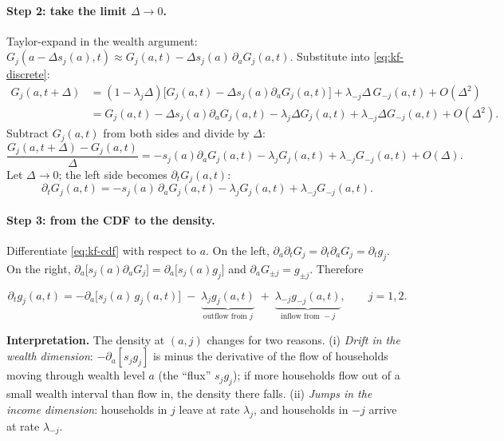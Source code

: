 \paragraph{Step 2: take the limit $\Delta\to0$.}
Taylor-expand in the wealth argument: $G_j(a-\Delta s_j(a),t)\approx G_j(a,t)-\Delta s_j(a)\,\partial_aG_j(a,t)$. Substitute into \eqref{eq:kf-discrete}:
\begin{align*}
  G_j(a,t+\Delta) &= (1-\lambda_j\Delta)\big[G_j(a,t)-\Delta s_j(a)\partial_aG_j(a,t)\big] + \lambda_{-j}\Delta\,G_{-j}(a,t) + O(\Delta^2)\\
  &= G_j(a,t) - \Delta s_j(a)\partial_aG_j(a,t) - \lambda_j\Delta G_j(a,t) + \lambda_{-j}\Delta G_{-j}(a,t) + O(\Delta^2).
\end{align*}
Subtract $G_j(a,t)$ from both sides and divide by $\Delta$:
\begin{equation*}
  \frac{G_j(a,t+\Delta)-G_j(a,t)}{\Delta} = - s_j(a)\partial_aG_j(a,t) - \lambda_j G_j(a,t) + \lambda_{-j} G_{-j}(a,t) + O(\Delta).
\end{equation*}
Let $\Delta\to0$; the left side becomes $\partial_tG_j(a,t)$:
\begin{equation}\label{eq:kf-cdf}
  \partial_t G_j(a,t) = -s_j(a)\,\partial_a G_j(a,t) - \lambda_j G_j(a,t) + \lambda_{-j}G_{-j}(a,t).
\end{equation}

\paragraph{Step 3: from the CDF to the density.}
Differentiate \eqref{eq:kf-cdf} with respect to $a$. On the left, $\partial_a\partial_tG_j=\partial_t\partial_aG_j=\partial_t g_j$. On the right, $\partial_a\big[s_j(a)\partial_aG_j\big]=\partial_a\big[s_j(a)g_j\big]$ and $\partial_aG_{\pm j}=g_{\pm j}$. Therefore
\begin{keybox}[title=Kolmogorov forward equation (two-state Poisson income)]
\begin{equation}\label{eq:kf-density}
  \partial_t g_j(a,t) = -\partial_a\big[s_j(a)\,g_j(a,t)\big] \;-\; \underbrace{\lambda_j g_j(a,t)}_{\text{outflow from }j} \;+\; \underbrace{\lambda_{-j}g_{-j}(a,t)}_{\text{inflow from }-j},\qquad j=1,2.
\end{equation}
\end{keybox}
\textbf{Interpretation.} The density at $(a,j)$ changes for two reasons. (i) \emph{Drift in the wealth dimension}: $-\partial_a[s_jg_j]$ is minus the derivative of the flow of households moving through wealth level $a$ (the ``flux'' $s_jg_j$); if more households flow out of a small wealth interval than flow in, the density there falls. (ii) \emph{Jumps in the income dimension}: households in $j$ leave at rate $\lambda_j$, and households in $-j$ arrive at rate $\lambda_{-j}$.

